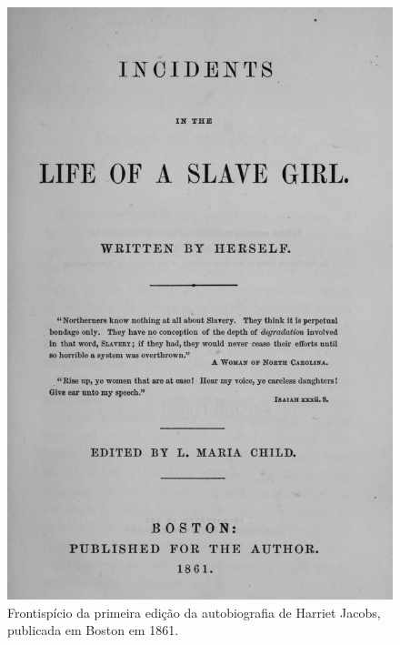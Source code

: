 \pagebreak

\thispagestyle{empty}

\movetoevenpage
\thispagestyle{empty}
\begin{absolutelynopagebreak}
\begin{vplace}
\begin{figure}[H]
\begin{adjustwidth}{-1.40cm}{}
  \centering
  \vspace*{-2.4cm}
  \includegraphics[width=125mm]{./imgs/front.jpg}  
\end{adjustwidth}
  \caption{Frontispício da primeira edição da autobiografia de Harriet Jacobs, publicada em Boston em 1861.}
\end{figure}
\end{vplace}

\thispagestyle{empty}
\end{absolutelynopagebreak}

